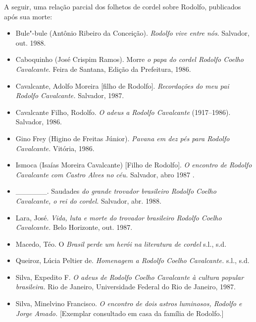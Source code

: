 A seguir, uma relação parcial dos folhetos de cordel sobre Rodolfo,
publicados após sua morte: 

\begin{itemize}

\item
Bule"-bule (Antônio Ribeiro da Conceição). \textit{Rodolfo vive entre
nós}. Salvador, out. 1988. 

\item 
 Caboquinho (José Crispim Ramos). Morre \textit{o papa do cordel Rodolfo
Coelho Cavalcante}. Feira de Santana, Edição da Prefeitura, 1986. 
\item 
 Cavalcante, Adolfo Moreira [filho de Rodolfo]. \textit{Recordações do
meu pai Rodolfo Cavalcante.} Salvador, 1987. 
\item 
 Cavalcante Filho, Rodolfo. \textit{O adeus a Rodolfo Cavalcante}
(1917--1986). Salvador, 1986. 
\item 

Gino Frey (Higino de Freitas Júnior). \textit{Pavana em dez pés para
Rodolfo Cavalcante.} Vitória, 1986. 
\item 

Ismoca (Isaías Moreira Cavalcante) [Filho de Rodolfo]. \textit{O
encontro de Rodolfo Cavalcante com Castro Alves no céu.} Salvador, abro
1987 . 
\item 

\_\_\_\_\_\_. Saudades \textit{do grande trovador brasileiro Rodolfo
Coelho Cavalcante, o rei do cordel.} Salvador, abr. 1988. 
\item 

Lara, José. \textit{Vida, luta e morte do trovador brasileiro Rodolfo
Coelho Cavalcante.} Belo Horizonte, out. 1987. 
\item 

Macedo, Téo. O \textit{Brasil perde um herói na literatura de cordel}
s.l., s.d. 
\item 

Queiroz, Lúcia Peltier de. \textit{Homenagem a Rodolfo Coelho
Cavalcante.} s.l., s.d. 
\item 
Silva, Expedito F. \textit{O adeus de Rodolfo Coelho Cavalcante à
cultura popular brasileira.} Rio de Janeiro, Universidade Federal do
Rio de Janeiro, 1987. 
\item 

Silva, Minelvino Francisco. \textit{O encontro de dois astros luminosos,
Rodolfo e Jorge Amado.} [Exemplar consultado em casa da família de
Rodolfo.] 

\end{itemize}

